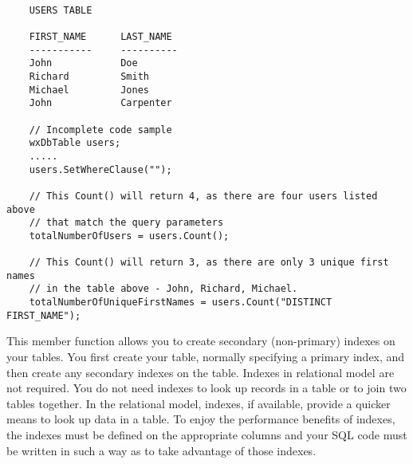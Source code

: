 \begin{verbatim}

    USERS TABLE

    FIRST_NAME      LAST_NAME
    -----------     ----------
    John            Doe
    Richard         Smith
    Michael         Jones
    John            Carpenter

    // Incomplete code sample
    wxDbTable users;
    .....
    users.SetWhereClause("");

    // This Count() will return 4, as there are four users listed above
    // that match the query parameters
    totalNumberOfUsers = users.Count();

    // This Count() will return 3, as there are only 3 unique first names
    // in the table above - John, Richard, Michael.
    totalNumberOfUniqueFirstNames = users.Count("DISTINCT FIRST_NAME");
\end{verbatim}

\label{wxdbtablecreateindex}


This member function allows you to create secondary (non-primary) indexes on
your tables.  You first create your table, normally specifying a primary
index, and then create any secondary indexes on the table.  Indexes in
relational model are not required.  You do not need indexes to look up records
in a table or to join two tables together.  In the relational model, indexes,
if available, provide a quicker means to look up data in a table.  To enjoy
the performance benefits of indexes, the indexes must be defined on the
appropriate columns and your SQL code must be written in such a way as to
take advantage of those indexes.



